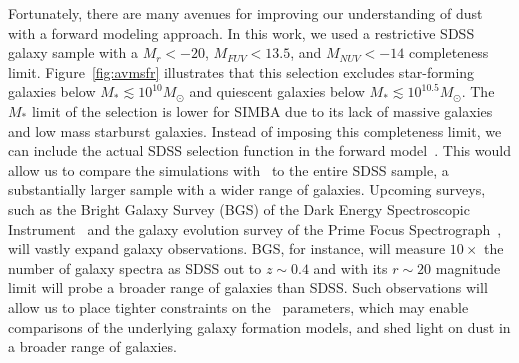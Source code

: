 Fortunately, there are many avenues for improving our understanding of dust
with a forward modeling approach. 
In this work, we used a restrictive SDSS galaxy sample with a $M_r < -20$,
$M_{FUV} < 13.5$, and $M_{NUV} < -14$ completeness limit. 
Figure~\ref{fig:avmsfr} illustrates that this selection excludes star-forming
galaxies below $M_* \lesssim 10^{10}M_\odot$ and quiescent
galaxies below $M_* \lesssim 10^{10.5}M_\odot$. 
The $M_*$ limit of the selection is lower for SIMBA due to its lack of massive
galaxies and low mass starburst galaxies. 
Instead of imposing this completeness limit, we can include the actual SDSS
selection function in the forward 
model~\citep[\eg~][]{dickey2020}. 
This would allow us to compare the simulations with \eda~to the entire SDSS
sample, a substantially larger sample with a wider range of galaxies. 
Upcoming surveys, such as the Bright Galaxy Survey (BGS) of the Dark Energy
Spectroscopic Instrument~\citep[DESI;][]{desicollaboration2016, ruiz-macias2020} 
and the galaxy evolution survey of the Prime Focus
Spectrograph~\citep[PFS;][]{takada2014,tamura2016}, will vastly expand galaxy
observations. 
BGS, for instance, will measure $10\times$ the number of galaxy spectra as
SDSS out to $z\sim0.4$  and with its $r\sim20$ magnitude limit will probe
a broader range of galaxies than SDSS.
Such observations will allow us to place tighter constraints on
the \eda~parameters, which may enable comparisons of the underlying galaxy
formation models, and shed light on dust in a broader range of galaxies.
    
